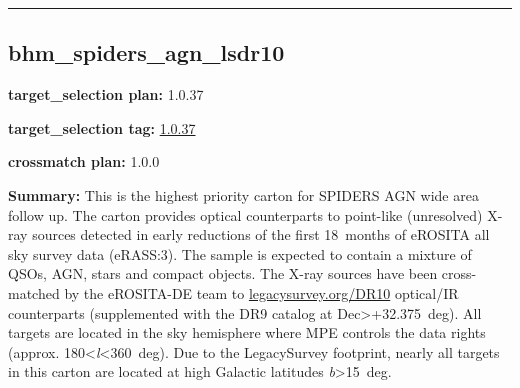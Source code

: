\begin{center}\rule{0.5\linewidth}{0.5pt}\end{center}

\hypertarget{bhm_spiders_agn_lsdr10_plan1.0.37}{%
\subsection{bhm\_spiders\_agn\_lsdr10}\label{bhm_spiders_agn_lsdr10_plan1.0.37}}

\noindent\textbf{target\_selection plan:} 1.0.37

\noindent\textbf{target\_selection tag:}
\href{https://github.com/sdss/target_selection/tree/1.0.37/}{1.0.37}

\noindent\textbf{crossmatch plan:} 1.0.0

\noindent\textbf{Summary:} This is the highest priority carton for SPIDERS AGN
wide area follow up. The carton provides optical counterparts to
point-like (unresolved) X-ray sources detected in early reductions of
the first 18~months of eROSITA all sky survey data (eRASS:3). The sample
is expected to contain a mixture of QSOs, AGN, stars and compact
objects. The X-ray sources have been cross-matched by the eROSITA-DE
team to \href{https://www.legacysurvey.org/dr10/}{legacysurvey.org/DR10}
optical/IR counterparts (supplemented with the DR9 catalog at
Dec\textgreater+32.375~deg). All targets are located in the sky
hemisphere where MPE controls the data rights (approx.
180\textless{}\emph{l}\textless360~deg). Due to the LegacySurvey
footprint, nearly all targets in this carton are located at high
Galactic latitudes \textbar{}\emph{b}\textbar\textgreater15~deg.

